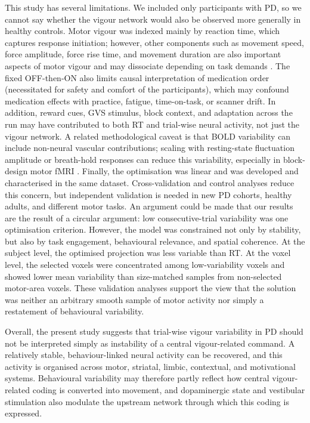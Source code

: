 \documentclass[utf8]{FrontiersinHarvard}
\begin{document}
This study has several limitations. We included only participants with PD, so we cannot say whether the vigour network would also be observed more generally in healthy controls. Motor vigour was indexed mainly by reaction time, which captures response initiation; however, other components such as movement speed, force amplitude, force rise time, and movement duration are also important aspects of motor vigour and may dissociate depending on task demands \citep{pierrieau2025changes}. The fixed OFF-then-ON also limits causal interpretation of medication order (necessitated for safety and comfort of the participants), which may confound medication effects with practice, fatigue, time-on-task, or scanner drift. In addition, reward cues, GVS stimulus, block context, and adaptation across the run may have contributed to both RT and trial-wise neural activity, not just the vigour network. A related methodological caveat is that BOLD variability can include non-neural vascular contributions; scaling with resting-state fluctuation amplitude or breath-hold responses can reduce this variability, especially in block-design motor fMRI \citep{kannurpatti2011non}. Finally, the optimisation was linear and was developed and characterised in the same dataset. Cross-validation and control analyses reduce this concern, but independent validation is needed in new PD cohorts, healthy adults, and different motor tasks. An argument could be made that our results are the result of a circular argument: low consecutive-trial variability was one optimisation criterion. However, the model was constrained not only by stability, but also by task engagement, behavioural relevance, and spatial coherence. At the subject level, the optimised projection was less variable than RT. At the voxel level, the selected voxels were concentrated among low-variability voxels and showed lower mean variability than size-matched samples from non-selected motor-area voxels. These validation analyses support the view that the solution was neither an arbitrary smooth sample of motor activity nor simply a restatement of behavioural variability.

Overall, the present study suggests that trial-wise vigour variability in PD should not be interpreted simply as instability of a central vigour-related command. A relatively stable, behaviour-linked neural activity can be recovered, and this activity is organised across motor, striatal, limbic, contextual, and motivational systems. Behavioural variability may therefore partly reflect how central vigour-related coding is converted into movement, and dopaminergic state and vestibular stimulation also modulate the upstream network through which this coding is expressed.
\end{document}
